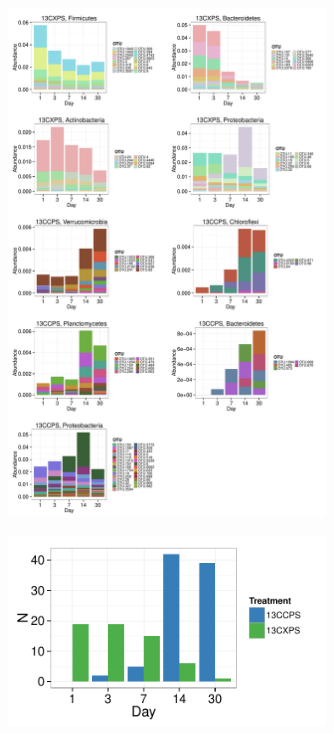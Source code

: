 \begin{figure}[H]
	\begin{center}
    \centerline{\includegraphics[width=0.75\textwidth]{figures/bulk_phylum_rspndr_abund/abund_v_time_phyla.pdf}}
	\caption{\protect}\label{fig:babund}
        \end{center}
\end{figure}

\begin{figure}[H]
	\begin{center}
	\centerline{\includegraphics[width=0.75\textwidth]{figures/all_rspndr_bar/all_rspndr_bar.pdf}}
	\caption{\protect}\label{fig:rspndr_count}
        \end{center}
\end{figure}

